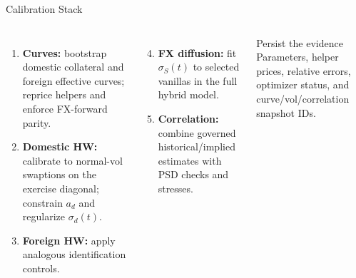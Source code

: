 \documentclass[aspectratio=169]{beamer}
\begin{document}
\begin{frame}{Calibration Stack}
  \begin{columns}[T,onlytextwidth]
      \begin{enumerate}
        \item \textbf{Curves:} bootstrap domestic collateral and foreign
          effective curves; reprice helpers and enforce FX-forward parity.
        \item \textbf{Domestic HW:} calibrate to normal-vol swaptions on the
          exercise diagonal; constrain $a_d$ and regularize $\sigma_d(t)$.
        \item \textbf{Foreign HW:} apply analogous identification controls.
      \end{enumerate}
      \begin{enumerate}
        \setcounter{enumi}{3}
        \item \textbf{FX diffusion:} fit $\sigma_S(t)$ to selected vanillas in
          the full hybrid model.
        \item \textbf{Correlation:} combine governed historical/implied
          estimates with PSD checks and stresses.
      \end{enumerate}
      \begin{block}{Persist the evidence}
        Parameters, helper prices, relative errors, optimizer status, and
        curve/vol/correlation snapshot IDs.
      \end{block}
  \end{columns}
\end{frame}
\end{document}
